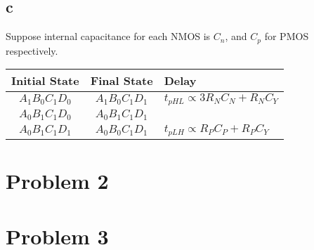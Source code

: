 \documentclass[a4paper,10pt]{article}
\begin{document}
\subsection*{c}
Suppose internal capacitance for each NMOS is \begin{math}C_n\end{math}, and \begin{math}C_p\end{math} for PMOS respectively.\\
\begin{tabular}{|c|c|l|}
 \hline
 Initial State&Final State&Delay\\ \hline
 \begin{math}A_1 B_0 C_1 D_0\end{math} & \begin{math}A_1 B_0 C_1 D_1\end{math} & \begin{math}t_{pHL}\propto 3R_N C_N + R_N C_Y\end{math}\\ \cline{1-2}
 \begin{math}A_0 B_1 C_1 D_0\end{math} & \begin{math}A_0 B_1 C_1 D_1\end{math} &\\ \hline
 \begin{math}A_0 B_1 C_1 D_1\end{math} & \begin{math}A_0 B_0 C_1 D_1\end{math} & \begin{math}t_{pLH}\propto R_P C_P + R_P C_Y\end{math}\\ \hline
\end{tabular}
\section*{Problem 2}
\section*{Problem 3}
\end{document}
